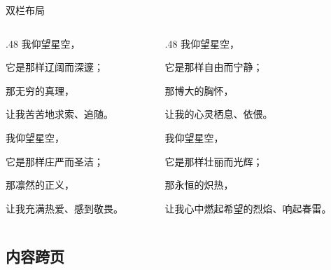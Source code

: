 \documentclass[aspectratio=169]{ctexbeamer} %
\begin{document}
\begin{frame}{双栏布局}
  \begin{columns}[t]
    \begin{column}{.48\textwidth}
      我仰望星空，

      它是那样辽阔而深邃；

      那无穷的真理，

      让我苦苦地求索、追随。

      我仰望星空，

      它是那样庄严而圣洁；

      那凛然的正义，

      让我充满热爱、感到敬畏。
    \end{column}
    \begin{column}{.48\textwidth}
      我仰望星空，

      它是那样自由而宁静；

      那博大的胸怀，

      让我的心灵栖息、依偎。

      我仰望星空，

      它是那样壮丽而光辉；

      那永恒的炽热，

      让我心中燃起希望的烈焰、响起春雷。
    \end{column}
  \end{columns}
\end{frame}

\subsection{内容跨页}
\end{document}
